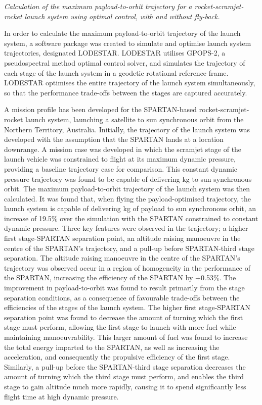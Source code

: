 	\vspace{10pt}
\emph{Calculation of the maximum payload-to-orbit trajectory for a rocket-scramjet-rocket launch system using optimal control, with and without fly-back.}

In order to calculate the maximum payload-to-orbit trajectory of the launch system, a software package was created to simulate and optimise launch system trajectories, designated LODESTAR. LODESTAR utilises GPOPS-2, a pseudospectral method optimal control solver, and simulates the trajectory of each stage of the launch system in a geodetic rotational reference frame. 
LODESTAR optimises the entire trajectory of the launch system simultaneously, so that the performance trade-offs between the stages are captured accurately.

A mission profile has been developed for the SPARTAN-based rocket-scramjet-rocket launch system, launching a satellite to sun synchronous orbit from the Northern Territory, Australia. 
Initially, the trajectory of the launch system was developed with the assumption that the SPARTAN lands at a location downrange.
A mission case was developed in which the scramjet stage of the launch vehicle was constrained to flight at its maximum dynamic pressure, providing a baseline trajectory case for comparison. This constant dynamic pressure trajectory was found to be capable of delivering \PayloadToOrbitConstqNoReturn kg to sun synchronous orbit. 
The maximum payload-to-orbit trajectory of the launch system was then calculated. It was found that, when flying the payload-optimised trajectory, the launch system is capable of delivering \PayloadToOrbitStandardNoReturn kg of payload to sun synchronous orbit, an increase of 19.5\% over the simulation with the SPARTAN constrained to constant dynamic pressure. 
Three key features were observed in the trajectory; a higher first stage-SPARTAN separation point, an altitude raising manoeuvre in the centre of the SPARTAN's trajectory, and a pull-up before SPARTAN-third stage separation.
The altitude raising manoeuvre in the centre of the SPARTAN's trajectory was observed occur in a region of homogeneity in the performance of the SPARTAN, increasing the efficiency of the SPARTAN by +0.53\%. 
The improvement in payload-to-orbit was found to result primarily from the stage separation conditions, as a consequence of favourable trade-offs between the efficiencies of the stages of the launch system.
The higher first stage-SPARTAN separation point was found to decrease the amount of turning which the first stage must perform, allowing the first stage to launch with more fuel while maintaining manoeuvrability. This larger amount of fuel was found to increase the total energy imparted to the SPARTAN, as well as increasing the acceleration, and consequently the propulsive efficiency of the first stage. Similarly, a pull-up before the SPARTAN-third stage separation decreases the amount of turning which the third stage must perform, and enables the third stage to gain altitude much more rapidly, causing it to spend significantly less flight time at high dynamic pressure. 
